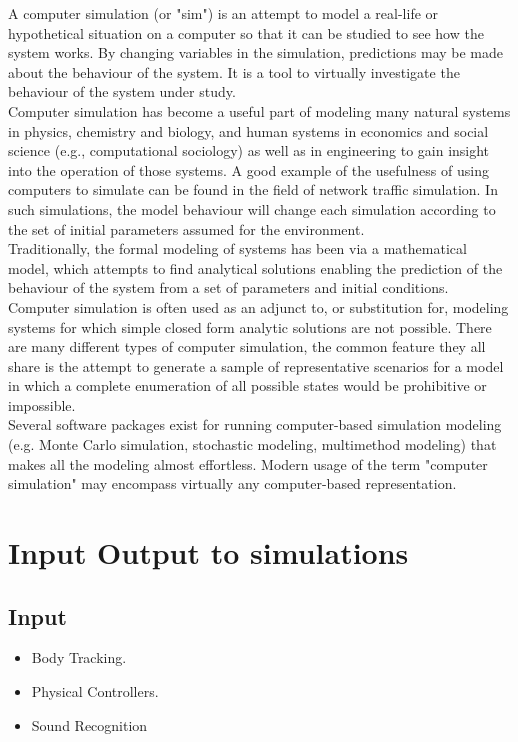 \documentclass[12pt]{report}
\begin{document}
A computer simulation (or "sim") is an attempt to model a real-life or hypothetical situation on a computer so that it can be studied to see how the system works. By changing variables in the simulation, predictions may be made about the behaviour of the system. It is a tool to virtually investigate the behaviour of the system under study.
\\
Computer simulation has become a useful part of modeling many natural systems in physics, chemistry and biology, and human systems in economics and social science (e.g., computational sociology) as well as in engineering to gain insight into the operation of those systems. A good example of the usefulness of using computers to simulate can be found in the field of network traffic simulation. In such simulations, the model behaviour will change each simulation according to the set of initial parameters assumed for the environment.
\\
Traditionally, the formal modeling of systems has been via a mathematical model, which attempts to find analytical solutions enabling the prediction of the behaviour of the system from a set of parameters and initial conditions. Computer simulation is often used as an adjunct to, or substitution for, modeling systems for which simple closed form analytic solutions are not possible. There are many different types of computer simulation, the common feature they all share is the attempt to generate a sample of representative scenarios for a model in which a complete enumeration of all possible states would be prohibitive or impossible.
\\
Several software packages exist for running computer-based simulation modeling (e.g. Monte Carlo simulation, stochastic modeling, multimethod modeling) that makes all the modeling almost effortless.
Modern usage of the term "computer simulation" may encompass virtually any computer-based representation.

\section{Input Output to simulations}

\subsection{Input}
\begin{itemize}
  \item Body Tracking.
  \item Physical Controllers.
  \item Sound Recognition
\end{itemize}
\end{document}
